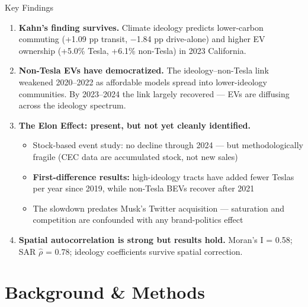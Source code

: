 \documentclass[aspectratio=169,t]{beamer}
\begin{document}
\begin{frame}{Key Findings}
  \begin{enumerate}
    \item \textbf{Kahn's finding survives.} Climate ideology predicts lower-carbon commuting
    (+1.09 pp transit, $-$1.84 pp drive-alone) and higher EV ownership (+5.0\% Tesla,
    +6.1\% non-Tesla) in 2023 California.

    \vspace{0.3em}
    \item \textbf{Non-Tesla EVs have democratized.} The ideology--non-Tesla link weakened
    2020--2022 as affordable models spread into lower-ideology communities. By 2023--2024
    the link largely recovered --- EVs are diffusing across the ideology spectrum.

    \vspace{0.3em}
    \item \textbf{The Elon Effect: present, but not yet cleanly identified.}
    \begin{itemize}\small
      \item Stock-based event study: no decline through 2024 --- but methodologically fragile
            (CEC data are accumulated stock, not new sales)
      \item \textbf{First-difference results:} high-ideology tracts have added fewer Teslas per
            year since 2019, while non-Tesla BEVs recover after 2021
      \item The slowdown predates Musk's Twitter acquisition --- saturation and competition
            are confounded with any brand-politics effect
    \end{itemize}

    \vspace{0.3em}
    \item \textbf{Spatial autocorrelation is strong but results hold.}
    Moran's I = 0.58; SAR $\hat{\rho}$ = 0.78; ideology coefficients survive spatial correction.
  \end{enumerate}
\end{frame}

\section{Background \& Methods}
\end{document}

